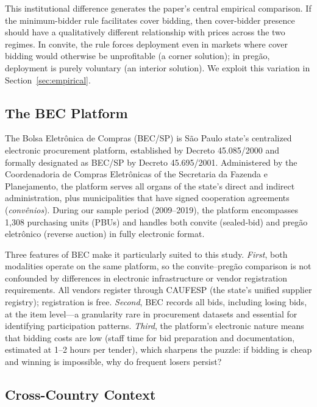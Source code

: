 This institutional difference generates the paper's central
empirical comparison. If the minimum-bidder rule facilitates
cover bidding, then cover-bidder presence should have a
qualitatively different relationship with prices across the two
regimes. In convite, the rule forces deployment even in markets
where cover bidding would otherwise be unprofitable (a corner
solution); in preg\~ao, deployment is purely voluntary (an
interior solution). We exploit this variation in
Section~\ref{sec:empirical}.

\subsection{The BEC Platform}
\label{sec:bec_platform}

The Bolsa Eletr\^onica de Compras (BEC/SP) is S\~ao Paulo
state's centralized electronic procurement platform, established
by Decreto 45.085/2000 and formally designated as BEC/SP by
Decreto 45.695/2001. Administered by the Coordenadoria de
Compras Eletr\^onicas of the Secretaria da Fazenda e Planejamento,
the platform serves all organs of the state's direct and indirect
administration, plus municipalities that have signed cooperation
agreements (\emph{conv\^enios}). During our sample period
(2009--2019), the platform encompasses 1,308 purchasing units
(PBUs) and handles both convite (sealed-bid) and preg\~ao
eletr\^onico (reverse auction) in fully electronic format.

Three features of BEC make it particularly suited to this study.
\emph{First}, both modalities operate on the same platform, so
the convite--preg\~ao comparison is not confounded by differences
in electronic infrastructure or vendor registration requirements.
All vendors register through CAUFESP (the state's unified supplier
registry); registration is free. \emph{Second}, BEC records all
bids, including losing bids, at the item level---a granularity
rare in procurement datasets and essential for identifying
participation patterns. \emph{Third}, the platform's electronic
nature means that bidding costs are low (staff time for bid
preparation and documentation, estimated at 1--2 hours per tender),
which sharpens the puzzle: if bidding is cheap and winning is
impossible, why do frequent losers persist?

\subsection{Cross-Country Context}
\label{sec:crosscountry}


